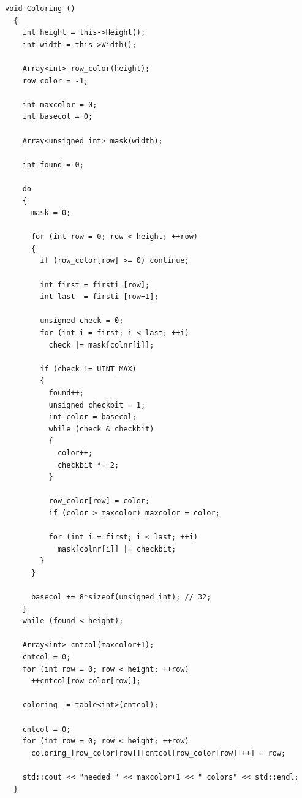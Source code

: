 \documentclass[a4paper,11pt]{scrartcl}
\begin{document}
\begin{lstlisting}
void Coloring ()
  {
    int height = this->Height();
    int width = this->Width();

    Array<int> row_color(height);
    row_color = -1;

    int maxcolor = 0;
    int basecol = 0;

    Array<unsigned int> mask(width);

    int found = 0;

    do
    {
      mask = 0;

      for (int row = 0; row < height; ++row)
      {
        if (row_color[row] >= 0) continue;

        int first = firsti [row];
        int last  = firsti [row+1];

        unsigned check = 0;
        for (int i = first; i < last; ++i)
          check |= mask[colnr[i]];

        if (check != UINT_MAX)
        {
          found++;
          unsigned checkbit = 1;
          int color = basecol;
          while (check & checkbit)
          {
            color++;
            checkbit *= 2;
          }

          row_color[row] = color;
          if (color > maxcolor) maxcolor = color;

          for (int i = first; i < last; ++i)
            mask[colnr[i]] |= checkbit;
        }
      }

      basecol += 8*sizeof(unsigned int); // 32;
    }
    while (found < height);

    Array<int> cntcol(maxcolor+1);
    cntcol = 0;
    for (int row = 0; row < height; ++row)
      ++cntcol[row_color[row]];

    coloring_ = table<int>(cntcol);

    cntcol = 0;
    for (int row = 0; row < height; ++row)
      coloring_[row_color[row]][cntcol[row_color[row]]++] = row;

    std::cout << "needed " << maxcolor+1 << " colors" << std::endl;
  }

\end{lstlisting}
\end{document}
